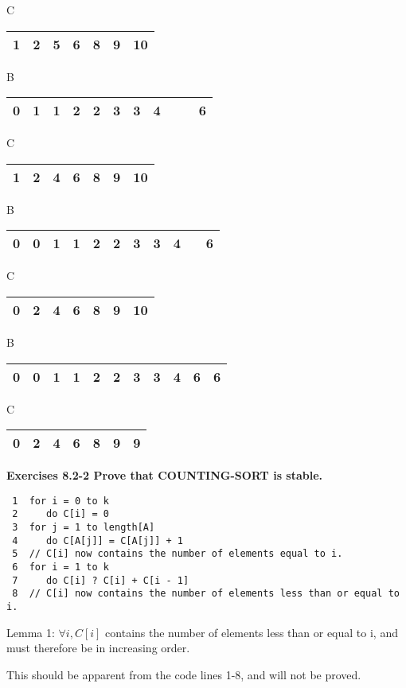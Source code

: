 \documentclass[10pt,fullpage]{article}
\begin{document}
C \begin{tabular}{|c|c|c|c|c|c|c|}
  \hline
  1 & 2 & 5 & 6 & 8 & 9 & 10 \\
  \hline
\end{tabular}

B \begin{tabular}{|c|c|c|c|c|c|c|c|c|c|c|}
  \hline
  0 & 1 & 1 & 2 & 2 & 3 & 3 & 4 & &  & 6 \\
  \hline
\end{tabular}

C \begin{tabular}{|c|c|c|c|c|c|c|}
  \hline
  1 & 2 & 4 & 6 & 8 & 9 & 10 \\
  \hline
\end{tabular}

B \begin{tabular}{|c|c|c|c|c|c|c|c|c|c|c|}
  \hline
  0 & 0 & 1 & 1 & 2 & 2 & 3 & 3 & 4 & & 6 \\
  \hline
\end{tabular}

C \begin{tabular}{|c|c|c|c|c|c|c|}
  \hline
  0 & 2 & 4 & 6 & 8 & 9 & 10 \\
  \hline
\end{tabular}

B \begin{tabular}{|c|c|c|c|c|c|c|c|c|c|c|}
  \hline
  0 & 0 & 1 & 1 & 2 & 2 & 3 & 3 & 4 & 6 & 6 \\
  \hline
\end{tabular}

C \begin{tabular}{|c|c|c|c|c|c|c|}
  \hline
  0 & 2 & 4 & 6 & 8 & 9 & 9 \\
  \hline
\end{tabular}
\newpage
\textbf{Exercises 8.2-2 Prove that COUNTING-SORT is stable.}\\

\begin{verbatim}
 1  for i = 0 to k
 2     do C[i] = 0
 3  for j = 1 to length[A]
 4     do C[A[j]] = C[A[j]] + 1
 5  // C[i] now contains the number of elements equal to i.
 6  for i = 1 to k
 7     do C[i] ? C[i] + C[i - 1]
 8  // C[i] now contains the number of elements less than or equal to i.
\end{verbatim}

Lemma 1: $\forall i, C[i]$ contains the number of elements less
than or equal to i, and must therefore be in increasing order.

This should be apparent from the code lines 1-8, and will not be
proved.
\end{document}
